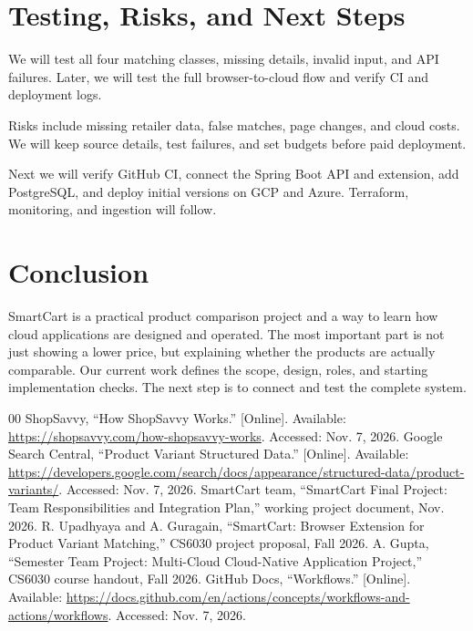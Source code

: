 \documentclass[conference,10pt]{IEEEtran}
\begin{document}
\section{Testing, Risks, and Next Steps}
We will test all four matching classes, missing details, invalid input, and API failures. Later, we will test the full browser-to-cloud flow and verify CI and deployment logs.

Risks include missing retailer data, false matches, page changes, and cloud costs. We will keep source details, test failures, and set budgets before paid deployment.

Next we will verify GitHub CI, connect the Spring Boot API and extension, add PostgreSQL, and deploy initial versions on GCP and Azure. Terraform, monitoring, and ingestion will follow.

\section{Conclusion}
SmartCart is a practical product comparison project and a way to learn how cloud applications are designed and operated. The most important part is not just showing a lower price, but explaining whether the products are actually comparable. Our current work defines the scope, design, roles, and starting implementation checks. The next step is to connect and test the complete system.

\begin{thebibliography}{00}
 ShopSavvy, ``How ShopSavvy Works.'' [Online]. Available: \url{https://shopsavvy.com/how-shopsavvy-works}. Accessed: Nov. 7, 2026.
 Google Search Central, ``Product Variant Structured Data.'' [Online]. Available: \url{https://developers.google.com/search/docs/appearance/structured-data/product-variants/}. Accessed: Nov. 7, 2026.
 SmartCart team, ``SmartCart Final Project: Team Responsibilities and Integration Plan,'' working project document, Nov. 2026.
 R. Upadhyaya and A. Guragain, ``SmartCart: Browser Extension for Product Variant Matching,'' CS6030 project proposal, Fall 2026.
 A. Gupta, ``Semester Team Project: Multi-Cloud Cloud-Native Application Project,'' CS6030 course handout, Fall 2026.
 GitHub Docs, ``Workflows.'' [Online]. Available: \url{https://docs.github.com/en/actions/concepts/workflows-and-actions/workflows}. Accessed: Nov. 7, 2026.
\end{thebibliography}
\end{document}

